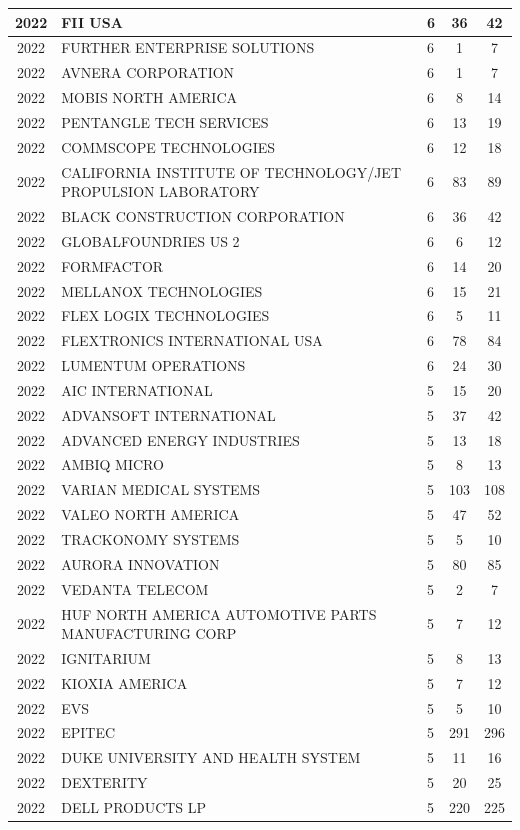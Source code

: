 \documentclass{article}%
\begin{document}
\begin{longtable}{c|p{20em}|p{5em}|c|c}
\hline%
2022&FII USA&6&36&42\\%
\hline%
2022&FURTHER ENTERPRISE SOLUTIONS&6&1&7\\%
\hline%
2022&AVNERA CORPORATION&6&1&7\\%
\hline%
2022&MOBIS NORTH AMERICA&6&8&14\\%
\hline%
2022&PENTANGLE TECH SERVICES&6&13&19\\%
\hline%
2022&COMMSCOPE TECHNOLOGIES&6&12&18\\%
\hline%
2022&CALIFORNIA INSTITUTE OF TECHNOLOGY/JET PROPULSION LABORATORY&6&83&89\\%
\hline%
2022&BLACK CONSTRUCTION CORPORATION&6&36&42\\%
\hline%
2022&GLOBALFOUNDRIES US 2&6&6&12\\%
\hline%
2022&FORMFACTOR&6&14&20\\%
\hline%
2022&MELLANOX TECHNOLOGIES&6&15&21\\%
\hline%
2022&FLEX LOGIX TECHNOLOGIES&6&5&11\\%
\hline%
2022&FLEXTRONICS INTERNATIONAL USA&6&78&84\\%
\hline%
2022&LUMENTUM OPERATIONS&6&24&30\\%
\hline%
2022&AIC INTERNATIONAL&5&15&20\\%
\hline%
2022&ADVANSOFT INTERNATIONAL&5&37&42\\%
\hline%
2022&ADVANCED ENERGY INDUSTRIES&5&13&18\\%
\hline%
2022&AMBIQ MICRO&5&8&13\\%
\hline%
2022&VARIAN MEDICAL SYSTEMS&5&103&108\\%
\hline%
2022&VALEO NORTH AMERICA&5&47&52\\%
\hline%
2022&TRACKONOMY SYSTEMS&5&5&10\\%
\hline%
2022&AURORA INNOVATION&5&80&85\\%
\hline%
2022&VEDANTA TELECOM&5&2&7\\%
\hline%
2022&HUF NORTH AMERICA AUTOMOTIVE PARTS MANUFACTURING CORP&5&7&12\\%
\hline%
2022&IGNITARIUM&5&8&13\\%
\hline%
2022&KIOXIA AMERICA&5&7&12\\%
\hline%
2022&EVS&5&5&10\\%
\hline%
2022&EPITEC&5&291&296\\%
\hline%
2022&DUKE UNIVERSITY AND HEALTH SYSTEM&5&11&16\\%
\hline%
2022&DEXTERITY&5&20&25\\%
\hline%
2022&DELL PRODUCTS LP&5&220&225\\%

\end{longtable}
\end{document}
